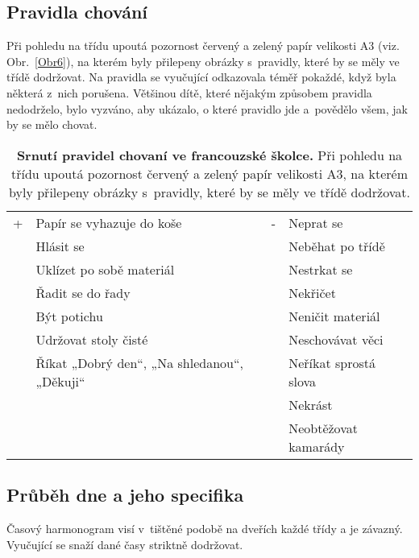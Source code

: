 		\subsection{Pravidla chování}
		\label{pravidlaChovani}
			Při pohledu na třídu upoutá pozornost červený a zelený papír velikosti A3 (viz. Obr.~\ref{Obr6}), na kterém byly přilepeny obrázky s pravidly, které by se měly ve třídě dodržovat. Na pravidla se vyučující odkazovala téměř pokaždé, když byla některá z nich porušena. Většinou dítě, které nějakým způsobem pravidla nedodrželo, bylo vyzváno, aby ukázalo, o které pravidlo jde a povědělo všem, jak by se mělo chovat. 

			\begin{spacing}{1.0}
			\begin{table}[h!]
				\center
				\begin{tabular}{|ll|ll|}
					\hline
					\rowcolor{grey!0}
				+	& Papír se vyhazuje do koše						& -	& Neprat se 			\\
					& Hlásit se 									&  	& Neběhat po třídě		\\
					& Uklízet po sobě materiál 						&	& Nestrkat se 			\\
					& Řadit se do řady 								&	& Nekřičet 				\\
					& Být potichu 									& 	& Neničit materiál 		\\
					& Udržovat stoly čisté 							& 	& Neschovávat věci 		\\
					& Říkat „Dobrý den“, „Na shledanou“, „Děkuji“	&	& Neříkat sprostá slova \\
					& 												&	& Nekrást				\\
					&												&	& Neobtěžovat kamarády 	\\
					\hline
				\end{tabular}
				\caption{ \textbf{Srnutí pravidel chovaní ve francouzské školce.}
					Při pohledu na třídu upoutá pozornost červený a zelený papír velikosti A3, na kterém byly přilepeny obrázky s pravidly, které by se měly ve třídě dodržovat.
				}
				\label{tab:pravidlaFR}
			\end{table}
			\end{spacing}




		\subsection{Průběh dne a jeho specifika}

			Časový harmonogram visí v tištěné podobě na dveřích každé třídy a je závazný. Vyučující se snaží dané časy striktně dodržovat.


